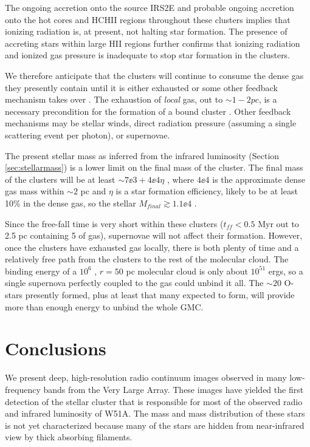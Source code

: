 The ongoing accretion onto the source IRS2E and probable ongoing accretion onto
the hot cores and HCHII regions throughout these clusters implies that ionizing
radiation is, at present, not halting star formation.  The presence of
accreting stars within large HII regions further confirms that ionizing
radiation and ionized gas pressure is inadequate to stop star formation in the
clusters.

We therefore anticipate that the clusters will continue to consume the dense
gas they presently contain until it is either exhausted or some other feedback
mechanism takes over \citep{Ginsburg2012a,Bressert2012a,Ginsburg2015a}.  The
exhaustion of \emph{local} gas, out to $\sim1-2 pc$, is a necessary
precondition for the formation of a bound cluster \citep{Kruijssen2012a}.
Other feedback mechanisms may be stellar winds, direct radiation pressure
(assuming a single scattering event per photon), or supernovae.

The present stellar mass as inferred from the infrared luminosity (Section
\ref{sec:stellarmass}) is a lower limit on the final mass of the cluster.  The
final mass of the clusters will be at least $\sim7\ee{3} + 4\ee{4} \eta$ \msun,
where $4\ee{4}$ \msun is the approximate dense gas mass within $\sim2$ pc and
$\eta$ is a star formation efficiency, likely to be at least 10\% in the dense
gas, so the stellar $M_{final} \gtrsim 1.1\ee{4}$ \msun.

Since the free-fall time is very short within these clusters ($t_{ff} < 0.5$
Myr out to 2.5 pc containing 5 \msun of gas), supernovae will not affect
their formation.  However, once the clusters have exhausted gas locally, there
is both plenty of time and a relatively free path from the clusters to the rest
of the molecular cloud.  The binding energy of a $10^6$ \msun, $r=50$ pc 
molecular cloud is only about $10^{51}$ ergs, so a single supernova perfectly
coupled to the gas could unbind it all.  The $\sim20$ O-stars presently formed,
plus at least that many expected to form, will provide more than enough energy
to unbind the whole GMC.


\section{Conclusions}
We present deep, high-resolution radio continuum images observed in many
low-frequency bands from the Very Large Array.  These images have yielded the
first detection of the stellar cluster that is responsible for most of the
observed radio and infrared luminosity of W51A.  The mass and mass distribution
of these stars is not yet characterized because many of the stars are hidden
from near-infrared view by thick absorbing filaments.

